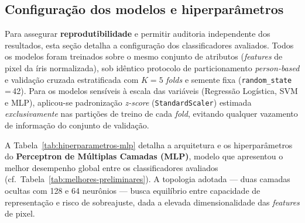 \documentclass[11pt,a4paper]{article}
\begin{document}
\subsection{Configuração dos modelos e hiperparâmetros}
\label{sec:hiperparametros}

Para assegurar \textbf{reprodutibilidade} e permitir auditoria independente dos resultados, esta seção detalha a configuração dos classificadores avaliados. Todos os modelos foram treinados sobre o mesmo conjunto de atributos (\textit{features} de pixel da íris normalizada), sob idêntico protocolo de particionamento \textit{person-based} e validação cruzada estratificada com \(K=5\) \textit{folds} e semente fixa (\texttt{random\_state}\,=\,42). Para os modelos sensíveis à escala das variáveis (Regressão Logística, SVM e MLP), aplicou-se padronização \textit{z-score} (\texttt{StandardScaler}) estimada \emph{exclusivamente} nas partições de treino de cada \textit{fold}, evitando qualquer vazamento de informação do conjunto de validação.

A Tabela~\ref{tab:hiperparametros-mlp} detalha a arquitetura e os hiperparâmetros do \textbf{Perceptron de Múltiplas Camadas (MLP)}, modelo que apresentou o melhor desempenho global entre os classificadores avaliados (cf.\ Tabela~\ref{tab:melhores-preliminares}). A topologia adotada --- duas camadas ocultas com 128 e 64 neurônios --- busca equilíbrio entre capacidade de representação e risco de sobreajuste, dada a elevada dimensionalidade das \textit{features} de pixel.
\end{document}
